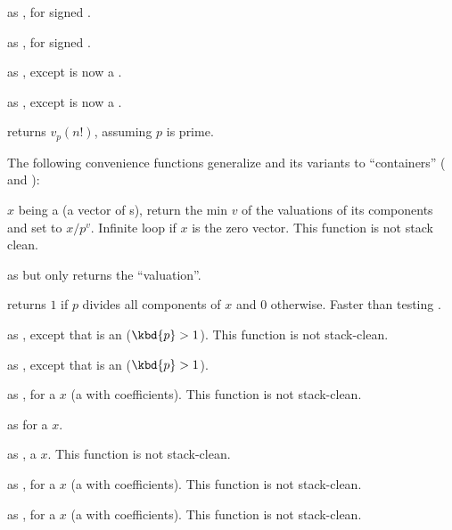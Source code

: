  as , for signed .

 as , for signed .

 as ,
except  is now a .

 as ,
except  is now a .

 returns $v_p(n!)$, assuming
$p$ is prime.

The following convenience functions generalize  and its variants
to ``containers'' ( and ):


 $x$ being a  (a vector
of s), return the min $v$ of the valuations of its components and
set  to $x/p^v$. Infinite loop if $x$ is the zero vector.
This function is not stack clean.

 as  but only returns the
``valuation''.

 returns $1$ if $p$ divides all components
of $x$ and $0$ otherwise. Faster than testing .

 as ,
except that  is an  ($\kbd{p} > 1$).
This function is not stack-clean.

 as ,
except that  is an  ($\kbd{p} > 1$).


 as , for
a  $x$ (a  with  coefficients).
This function is not stack-clean.

 as  for a  $x$.

 as ,
a  $x$.
This function is not stack-clean.

 as , for
a  $x$ (a  with  coefficients).
This function is not stack-clean.

 as , for
a  $x$ (a  with  coefficients).
This function is not stack-clean.

